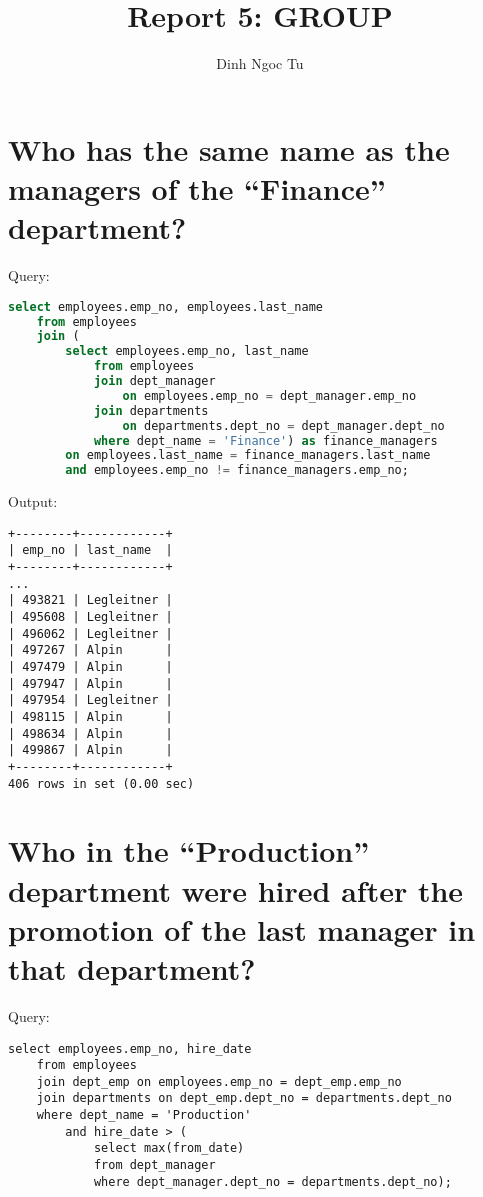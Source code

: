\documentclass[12pt]{article}
\title{Report 5: GROUP}
\author{Dinh Ngoc Tu}
\begin{document}
\maketitle


\section{Who has the same name as the managers of the ``Finance'' department?}

Query:

\begin{lstlisting}[language=SQL]
select employees.emp_no, employees.last_name
    from employees
    join (
        select employees.emp_no, last_name
            from employees
            join dept_manager
                on employees.emp_no = dept_manager.emp_no
            join departments
                on departments.dept_no = dept_manager.dept_no
            where dept_name = 'Finance') as finance_managers
        on employees.last_name = finance_managers.last_name
        and employees.emp_no != finance_managers.emp_no;
\end{lstlisting}

Output:

\begin{verbatim}
+--------+------------+
| emp_no | last_name  |
+--------+------------+
...
| 493821 | Legleitner |
| 495608 | Legleitner |
| 496062 | Legleitner |
| 497267 | Alpin      |
| 497479 | Alpin      |
| 497947 | Alpin      |
| 497954 | Legleitner |
| 498115 | Alpin      |
| 498634 | Alpin      |
| 499867 | Alpin      |
+--------+------------+
406 rows in set (0.00 sec)
\end{verbatim}


\section{Who in the ``Production'' department were hired after the promotion of the last manager in that department?}

Query:

\begin{verbatim}
select employees.emp_no, hire_date
    from employees
    join dept_emp on employees.emp_no = dept_emp.emp_no
    join departments on dept_emp.dept_no = departments.dept_no
    where dept_name = 'Production'
        and hire_date > (
            select max(from_date)
            from dept_manager
            where dept_manager.dept_no = departments.dept_no);
\end{verbatim}
\end{document}

